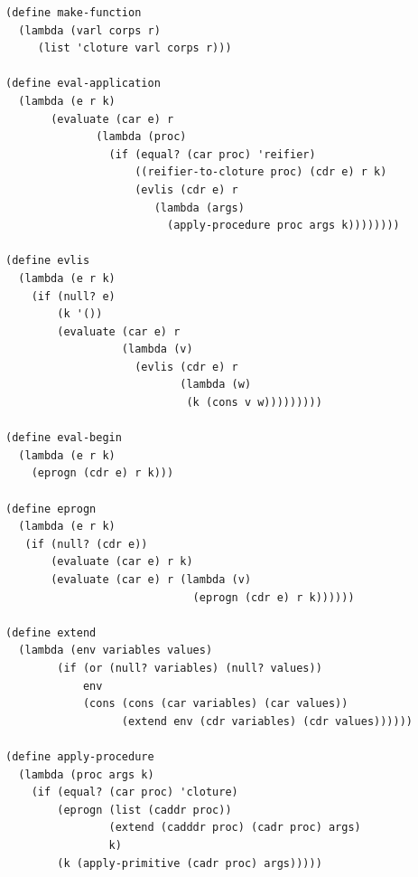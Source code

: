 \begin{footnotesize}
\begin{Verbatim}
(define make-function
  (lambda (varl corps r)
     (list 'cloture varl corps r)))

(define eval-application
  (lambda (e r k)
       (evaluate (car e) r
              (lambda (proc)
                (if (equal? (car proc) 'reifier)
                    ((reifier-to-cloture proc) (cdr e) r k)
                    (evlis (cdr e) r
                       (lambda (args)
                         (apply-procedure proc args k))))))))

(define evlis
  (lambda (e r k)
    (if (null? e)
        (k '())
        (evaluate (car e) r
                  (lambda (v)
                    (evlis (cdr e) r
                           (lambda (w)
                            (k (cons v w)))))))))

(define eval-begin
  (lambda (e r k)
    (eprogn (cdr e) r k)))

(define eprogn
  (lambda (e r k)
   (if (null? (cdr e))
       (evaluate (car e) r k)
       (evaluate (car e) r (lambda (v)
                             (eprogn (cdr e) r k))))))

(define extend
  (lambda (env variables values)
        (if (or (null? variables) (null? values))
            env
            (cons (cons (car variables) (car values))
                  (extend env (cdr variables) (cdr values))))))
         
(define apply-procedure
  (lambda (proc args k)
    (if (equal? (car proc) 'cloture)
        (eprogn (list (caddr proc))
                (extend (cadddr proc) (cadr proc) args)
                k)
        (k (apply-primitive (cadr proc) args))))) 


\end{Verbatim}
\end{footnotesize}

